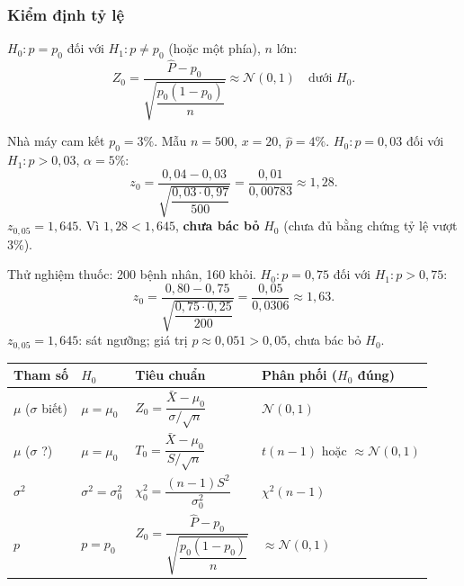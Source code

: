 \documentclass[12pt,a4paper]{article}
\begin{document}
\subsubsection{Kiểm định tỷ lệ}

\begin{congthuc}[title={Kiểm định tỷ lệ - mẫu lớn}]
  $H_0: p = p_0$ đối với $H_1: p \ne p_0$ (hoặc một phía), $n$ lớn:
  \[
    Z_0 = \dfrac{\hat{P} - p_0}{\sqrt{\dfrac{p_0(1-p_0)}{n}}} \approx \mathcal{N}(0,1) \quad \text{dưới } H_0.
  \]
\end{congthuc}

\begin{vidu}[title={Kiểm định tỷ lệ phế phẩm 4\%}]
Nhà máy cam kết $p_0 = 3\%$. Mẫu $n=500$, $x=20$, $\hat{p}=4\%$. $H_0: p=0{,}03$ đối với $H_1: p>0{,}03$, $\alpha=5\%$:
\[
  z_0 = \dfrac{0{,}04 - 0{,}03}{\sqrt{\dfrac{0{,}03 \cdot 0{,}97}{500}}} = \dfrac{0{,}01}{0{,}00783} \approx 1{,}28.
\]
$z_{0{,}05} = 1{,}645$. Vì $1{,}28 < 1{,}645$, \textbf{chưa bác bỏ} $H_0$ (chưa đủ bằng chứng tỷ lệ vượt 3\%).
\end{vidu}

\begin{vidu}[title={Kiểm định tỷ lệ}]
Thử nghiệm thuốc: 200 bệnh nhân, 160 khỏi. $H_0: p=0{,}75$ đối với $H_1: p>0{,}75$:
\[
  z_0 = \dfrac{0{,}80 - 0{,}75}{\sqrt{\dfrac{0{,}75 \cdot 0{,}25}{200}}} = \dfrac{0{,}05}{0{,}0306} \approx 1{,}63.
\]
$z_{0{,}05} = 1{,}645$: sát ngưỡng; giá trị $p \approx 0{,}051 > 0{,}05$, chưa bác bỏ $H_0$.
\end{vidu}

\begin{congthuc}[title={Tóm tắt kiểm định một mẫu}]
  \begin{center}
  \begin{tabular}{llll}
    \toprule
    Tham số & $H_0$ & Tiêu chuẩn & Phân phối ($H_0$ đúng) \\
    \midrule
    $\mu$ ($\sigma$ biết) & $\mu=\mu_0$ & $Z_0 = \dfrac{\bar{X}-\mu_0}{\sigma/\sqrt{n}}$ & $\mathcal{N}(0,1)$ \\
    $\mu$ ($\sigma$ ?) & $\mu=\mu_0$ & $T_0 = \dfrac{\bar{X}-\mu_0}{S/\sqrt{n}}$ & $t(n-1)$ hoặc $\approx\mathcal{N}(0,1)$ \\
    $\sigma^2$ & $\sigma^2=\sigma_0^2$ & $\chi^2_0 = \dfrac{(n-1)S^2}{\sigma_0^2}$ & $\chi^2(n-1)$ \\
    $p$ & $p=p_0$ & $Z_0 = \dfrac{\hat{P}-p_0}{\sqrt{\dfrac{p_0(1-p_0)}{n}}}$ & $\approx\mathcal{N}(0,1)$ \\
    \bottomrule
  \end{tabular}
  \end{center}
\end{congthuc}
\end{document}
